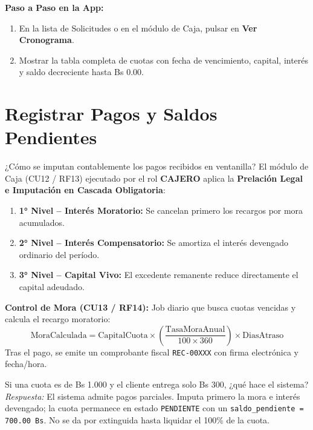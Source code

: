 \documentclass[11pt,letterpaper]{article}
\begin{document}
\begin{demobox}
\textbf{Paso a Paso en la App:}
\begin{enumerate}
    \item En la lista de Solicitudes o en el módulo de Caja, pulsar en \textbf{Ver Cronograma}.
    \item Mostrar la tabla completa de cuotas con fecha de vencimiento, capital, interés y saldo decreciente hasta Bs 0.00.
\end{enumerate}
\end{demobox}

\section{Registrar Pagos y Saldos Pendientes}

\begin{respuestabox}{¿Cómo se imputan contablemente los pagos recibidos en ventanilla?}
El módulo de Caja (CU12 / RF13) ejecutado por el rol \textbf{CAJERO} aplica la \textbf{Prelación Legal e Imputación en Cascada Obligatoria}:
\begin{enumerate}
    \item \textbf{1° Nivel -- Interés Moratorio:} Se cancelan primero los recargos por mora acumulados.
    \item \textbf{2° Nivel -- Interés Compensatorio:} Se amortiza el interés devengado ordinario del período.
    \item \textbf{3° Nivel -- Capital Vivo:} El excedente remanente reduce directamente el capital adeudado.
\end{enumerate}
\textbf{Control de Mora (CU13 / RF14):} Job diario que busca cuotas vencidas y calcula el recargo moratorio:
$$\text{MoraCalculada} = \text{CapitalCuota} \times \left( \frac{\text{TasaMoraAnual}}{100 \times 360} \right) \times \text{DiasAtraso}$$
Tras el pago, se emite un comprobante fiscal \texttt{REC-00XXX} con firma electrónica y fecha/hora.
\end{respuestabox}

\begin{preguntatrampabox}{Si una cuota es de Bs 1.000 y el cliente entrega solo Bs 300, ¿qué hace el sistema?}
\textit{Respuesta:} El sistema admite pagos parciales. Imputa primero la mora e interés devengado; la cuota permanece en estado \texttt{PENDIENTE} con un \texttt{saldo\_pendiente = 700.00 Bs}. No se da por extinguida hasta liquidar el 100\% de la cuota.
\end{preguntatrampabox}
\end{document}
